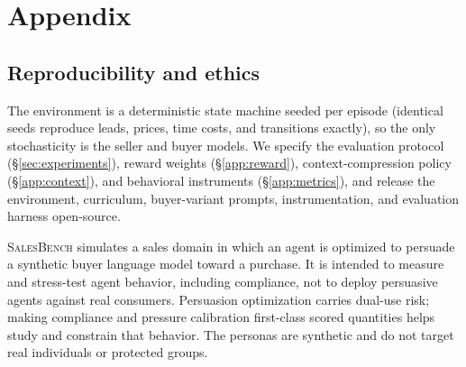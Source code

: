 \documentclass{article} %
\newcommand{\salesbench}{\textsc{SalesBench}}
\begin{document}



\appendix
\section{Appendix}

\subsection{Reproducibility and ethics}
\label{app:statements}
The environment is a deterministic state machine seeded per episode (identical seeds reproduce leads, prices, time
costs, and transitions exactly), so the only stochasticity is the seller and buyer models. We specify the evaluation
protocol (\S\ref{sec:experiments}), reward weights (\S\ref{app:reward}), context-compression policy
(\S\ref{app:context}), and behavioral instruments (\S\ref{app:metrics}), and release the environment, curriculum,
buyer-variant prompts, instrumentation, and evaluation harness open-source.

\salesbench{} simulates a sales domain in which an agent is optimized to persuade a synthetic buyer language model
toward a purchase. It is intended to measure and stress-test agent behavior, including compliance, not to deploy
persuasive agents against real consumers. Persuasion optimization carries dual-use risk; making compliance and
pressure calibration first-class scored quantities helps study and constrain that behavior. The personas are synthetic
and do not target real individuals or protected groups.
\end{document}
